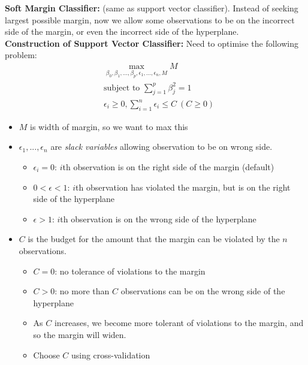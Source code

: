\documentclass[11pt]{article}
\begin{document}
\noindent \textbf{Soft Margin Classifier:} (same as support vector classifier). Instead of seeking largest possible margin, now we allow some observations to be on the incorrect side of the margin, or even the incorrect side of the hyperplane. \\

\noindent \textbf{Construction of Support Vector Classifier:} Need to optimise the following problem:
\begin{align}
    &\max_{\beta_0,\beta_1,...,\beta_p,\epsilon_1,...,\epsilon_n,M}{M} \label{eq:support_vec_class_1} \\
    &\text{subject to } \sum_{j=1}^{p}{\beta_j^2} = 1 \label{eq:support_vec_class_2} \\
    &\epsilon_{i} \geq 0, \sum_{i=1}^{n}\epsilon_i \leq C \: (C \geq 0 \label{eq:support_vec_class_3})
\end{align}
\begin{itemize}
    \item $M$ is width of margin, so we want to max this
    \item $\epsilon_1,...,\epsilon_n$ are \textit{slack variables} allowing observation to be on wrong side.
        \begin{itemize}
            \item $\epsilon_i = 0$: $i$th observation is on the right side of the margin (default)
            \item $0< \epsilon < 1$: $i$th observation has violated the margin, but is on the right side of the hyperplane
            \item $\epsilon>1$: $i$th observation is on the wrong side of the hyperplane
        \end{itemize}
    \item $C$ is the budget for the amount that the margin can be violated by the $n$ observations.
        \begin{itemize}
            \item $C=0$: no tolerance of violations to the margin
            \item $C > 0$: no more than $C$ observations can be on the wrong side of the hyperplane
            \item As $C$ increases, we become more tolerant of violations to the margin, and so the margin will widen.
            \item Choose $C$ using cross-validation
        \end{itemize}
\end{itemize} \phantom{i}
\end{document}
